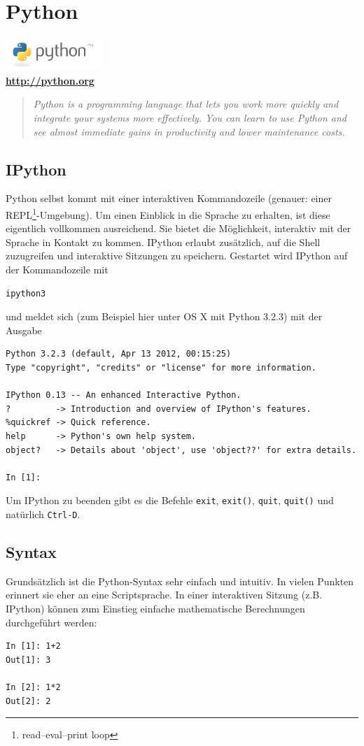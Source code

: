 \chapter{Python}
\begin{center}
  \includegraphics[width=140px]{img/python.png} \\
  \textbf{\url{http://python.org}}
\end{center}
\begin{quote}
  \textit{Python is a programming language that lets you work more quickly and integrate your systems more effectively.
          You can learn to use Python and see almost immediate gains in productivity and lower maintenance costs.}
\end{quote}

\section{IPython}
Python selbst kommt mit einer interaktiven Kommandozeile (genauer: einer REPL\footnote{read–eval–print loop}-Umgebung).
Um einen Einblick in die Sprache zu erhalten, ist diese eigentlich vollkommen ausreichend.
Sie bietet die Möglichkeit, interaktiv mit der Sprache in Kontakt zu kommen.
IPython erlaubt zusätzlich, auf die Shell zuzugreifen und interaktive Sitzungen zu speichern.
Gestartet wird IPython auf der Kommandozeile mit
\begin{verbatim}
ipython3
\end{verbatim}
und meldet sich (zum Beispiel hier unter OS X mit Python 3.2.3) mit der Ausgabe
\begin{verbatim}
Python 3.2.3 (default, Apr 13 2012, 00:15:25) 
Type "copyright", "credits" or "license" for more information.

IPython 0.13 -- An enhanced Interactive Python.
?         -> Introduction and overview of IPython's features.
%quickref -> Quick reference.
help      -> Python's own help system.
object?   -> Details about 'object', use 'object??' for extra details.

In [1]: 
\end{verbatim}
Um IPython zu beenden gibt es die Befehle \texttt{exit}, \texttt{exit()}, \texttt{quit}, \texttt{quit()} und natürlich \texttt{Ctrl-D}.

\section{Syntax}
Grundsätzlich ist die Python-Syntax sehr einfach und intuitiv.
In vielen Punkten erinnert sie eher an eine Scriptsprache.
In einer interaktiven Sitzung (z.B. IPython) können zum Einstieg einfache mathematische Berechnungen durchgeführt werden:
\begin{verbatim}
In [1]: 1+2
Out[1]: 3

In [2]: 1*2
Out[2]: 2
\end{verbatim}

